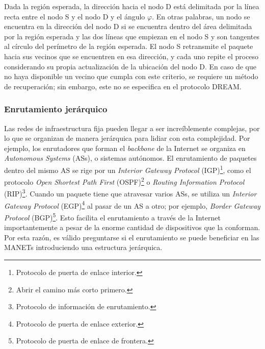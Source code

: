 
Dada la región esperada, la dirección hacia el nodo D está delimitada por la
línea recta entre el nodo S y el nodo D y el ángulo $\varphi$. En otras
palabras, un nodo se encuentra en la dirección del nodo D si se encuentra
dentro del área delimitada por la región esperada y las dos líneas que empiezan
en el nodo S y son tangentes al círculo del perímetro de la región esperada. El
nodo S retransmite el paquete hacia sus vecinos que se encuentren en esa
dirección, y cada uno repite el proceso considerando su propia actualización de
la ubicación del nodo D. En caso de que no haya disponible un vecino que cumpla
con este criterio, se requiere un método de recuperación; sin embargo, este no
se especifica en el protocolo DREAM.

\subsubsection{Enrutamiento jerárquico}

\label{subsubsec:enrutamiento_jerarquico}

Las redes de infraestructura fija pueden llegar a ser increíblemente complejas,
por lo que se organizan de manera jerárquica para lidiar con esta complejidad.
Por ejemplo, los enrutadores que forman el \textit{backbone} de la Internet se
organiza en \textit{Autonomous Systems} (ASs), o sistemas autónomos. El
enrutamiento de paquetes dentro del mismo AS se rige por un \textit{Interior
Gateway Protocol} (IGP)\footnote{Protocolo de puerta de enlace interior.}, como
el protocolo \textit{Open Shortest Path First} (OSPF)\footnote{Abrir el camino
más corto primero.} o \textit{Routing Information Protocol}
(RIP)\footnote{Protocolo de información de enrutamiento.}. Cuando un paquete
tiene que atravesar varios ASs, se utiliza un \textit{Interior Gateway Protocol}
(EGP)\footnote{Protocolo de puerta de enlace exterior.} al pasar de un AS a
otro; por ejemplo, \textit{Border Gateway Protocol} (BGP)\footnote{Protocolo
de puerta de enlace de frontera.}.
Esto facilita el enrutamiento a través de la Internet importantemente a pesar de
la enorme cantidad de dispositivos que la conforman. Por esta razón, es válido
preguntarse si el enrutamiento se puede beneficiar en las MANETs introduciendo
una estructura jerárquica.

